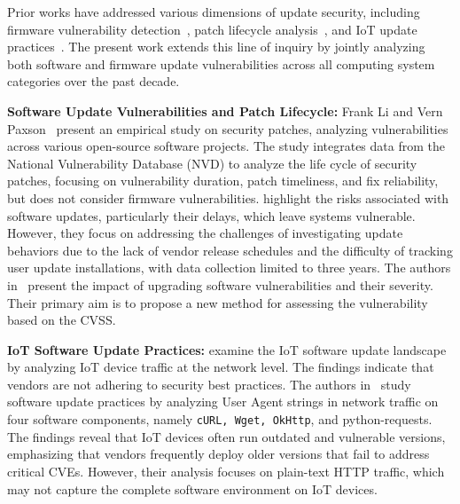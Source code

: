 \documentclass[fleqn,s1,names,tex]{neptune}
\begin{document}
Prior works have addressed various dimensions of update security, including
firmware vulnerability detection~\citep{294541,10190484}, patch lifecycle
analysis~\citep{10.1145/3133956.3134072}, and IoT update
practices~\citep{10.1007/978-3-031-30122-3_25,10.1145/3560835.3564551}. The
present work extends this line of inquiry by jointly analyzing both software
and firmware update vulnerabilities across all computing system categories over
the past decade.


 

\cvpt\textbf{Software Update Vulnerabilities and Patch Lifecycle:}
 Frank Li and Vern Paxson~\citep{10.1145/3133956.3134072} present an empirical
study on security patches, 
analyzing vulnerabilities across various open-source software projects. 
The study integrates data from the National Vulnerability Database (NVD) to analyze the life cycle of security patches, focusing on vulnerability duration, patch timeliness, and fix reliability, but does not consider firmware vulnerabilities.
\citet{10.1007/978-3-030-80825-9_11} highlight the risks associated with
software updates, particularly their delays, which leave systems vulnerable.
However, they focus on addressing the challenges of investigating update
behaviors due to the lack of vendor release schedules and the difficulty of
tracking user update installations, with data collection limited to three
years.
The authors in~\citet{8022734} present the impact of upgrading software
vulnerabilities and their severity.
Their primary aim is to propose a new method for assessing the vulnerability based on the CVSS.

 

\cvpt\textbf{IoT Software Update Practices:}
 \citet{10.1007/978-3-031-30122-3_25} examine the IoT
software update landscape by analyzing IoT device traffic at the network level.
The findings indicate that vendors are not adhering to security best practices.
 The authors in~\citet{10.1145/3560835.3564551} study software update practices
by analyzing User Agent strings in network traffic on four software components,
namely \texttt{cURL, Wget, OkHttp}, and python-requests. 
The findings reveal that IoT devices often run outdated and vulnerable versions, emphasizing that vendors frequently deploy older versions that fail to address critical CVEs. 
However, their analysis focuses on plain-text HTTP traffic, which may not capture the complete software environment on IoT devices.

 
\end{document}
